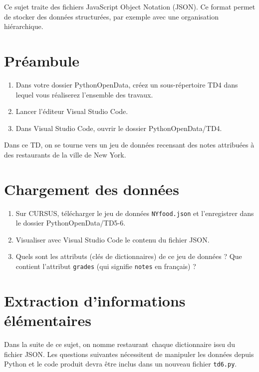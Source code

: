 \documentclass[11pt,a4paper]{article}
\begin{document}
Ce sujet traite des fichiers JavaScript Object Notation (JSON).
Ce format permet de stocker des données structurées, par exemple avec une organisation hiérarchique.

\section*{Préambule}
\begin{enumerate}
    \item Dans votre dossier PythonOpenData, créez un sous-répertoire TD4 dans lequel vous réaliserez l'ensemble des travaux.
    \item Lancer l'éditeur Visual Studio Code.
    \item Dans Visual Studio Code, ouvrir le dossier PythonOpenData/TD4. 
\end{enumerate}

Dans ce TD, on se tourne vers un jeu de données recensant des notes attribuées à des restaurants de la ville de New York.

\section{Chargement des données}

\begin{enumerate}
    \item Sur CURSUS, télécharger le jeu de données \verb+NYfood.json+ et l'enregistrer dans le dossier PythonOpenData/TD5-6.
    \item Visualiser avec Visual Studio Code le contenu du fichier JSON.
    \item Quels sont les attributs (clés de dictionnaires) de ce jeu de données ? Que contient l'attribut \verb+grades+ (qui signifie \verb+notes+ en français) ?
\end{enumerate}

\section{Extraction d'informations élémentaires}

Dans la suite de ce sujet, on nomme \og restaurant\fg ~chaque dictionnaire issu du fichier JSON.
Les questions suivantes nécessitent de manipuler les données depuis Python et le code produit devra être inclus dans un nouveau fichier \verb+td6.py+.
\end{document}
